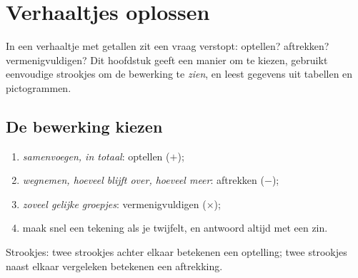 \chapter{Verhaaltjes oplossen}\label{ch:g2:problems}

In een verhaaltje met getallen zit een vraag verstopt: optellen?
aftrekken? vermenigvuldigen? Dit hoofdstuk geeft een manier om te
kiezen, gebruikt eenvoudige strookjes om de bewerking te \emph{zien},
en leest gegevens uit tabellen en pictogrammen.

\section{De bewerking kiezen}

\begin{method}\label{met:g2:problems:choose}
\begin{enumerate}
  \item \emph{samenvoegen, in totaal}: optellen ($+$);
  \item \emph{wegnemen, hoeveel blijft over, hoeveel meer}: aftrekken
        ($-$);
  \item \emph{zoveel gelijke groepjes}: vermenigvuldigen ($\times$);
  \item maak snel een tekening als je twijfelt, en antwoord altijd met
        een zin.
\end{enumerate}
\end{method}

\begin{omfigure}

{\small Strookjes: twee strookjes achter elkaar betekenen een
optelling; twee strookjes naast elkaar vergeleken betekenen een
aftrekking.}
\end{omfigure}

